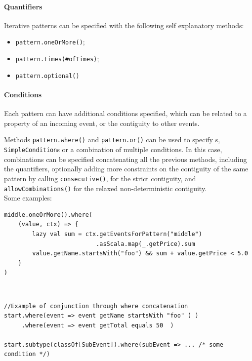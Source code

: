 \paragraph{Quantifiers}

Iterative patterns can be specified with the following self explanatory methods:

\begin{itemize}
    \item \texttt{pattern.oneOrMore()};
    \item \texttt{pattern.times(\#ofTimes)};
    \item \texttt{pattern.optional()}
\end{itemize}

\paragraph{Conditions}

Each pattern can have additional conditions specified, which can be related to a property of an incoming event, or the contiguity to other events.

Methods \texttt{pattern.where()} and \texttt{pattern.or()} can be used to specify \texttt{}s, \texttt{SimpleCondition}s or a combination of multiple conditions. In this case, combinations can be specified concatenating all the previous methods, including the quantifiers, optionally adding more constraints on the contiguity of the same pattern by calling \texttt{consecutive()}, for the strict contiguity, and \texttt{allowCombinations()} for the relaxed non-deterministic contiguity.
\\
Some examples:

\begin{code}
\label{code:iterative-cond}
\begin{verbatim}
middle.oneOrMore().where(
    (value, ctx) => {
        lazy val sum = ctx.getEventsForPattern("middle")
                          .asScala.map(_.getPrice).sum
        value.getName.startsWith("foo") && sum + value.getPrice < 5.0
    }
)
\end{verbatim}
\end{code}~\\

\begin{code}
    \label{code:simple-cond}
    \begin{verbatim}
//Example of conjunction through where concatenation
start.where(event => event getName startsWith "foo" ) )
     .where(event => event getTotal equals 50  )

start.subtype(classOf[SubEvent]).where(subEvent => ... /* some condition */)
    \end{verbatim}
\end{code}~\\


